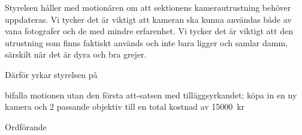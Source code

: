 \documentclass[../_main/handlingar.tex]{subfiles}
\begin{document}
\motionssvar

Styrelsen håller med motionären om att sektionens kamerautrustning behöver uppdateras. Vi tycker det är viktigt att kameran ska kunna användas både av vana fotografer och de med mindre erfarenhet. Vi tycker det är viktigt att den utrustning som finns faktiskt används och inte bara ligger och samlar damm, särskilt när det är dyra och bra grejer. 

Därför yrkar styrelsen på 

\begin{attsatser}
    \att bifalla motionen utan den första att-satsen med tilläggsyrkandet;
    \att köpa in en ny kamera och 2 passande objektiv till en total kostnad av \SI{15 000}{kr}
\end{attsatser}

\begin{signatures}{1}
    \ist
    \signature{Daniel Bakic}{Ordförande}
\end{signatures}
\end{document}
